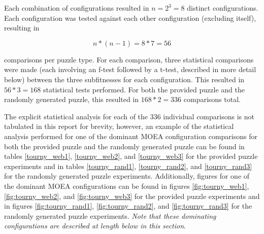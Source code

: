 \documentclass[11pt]{article}
\begin{document}
Each combination of configurations resulted in \begin{math} n = 2^3 = 8 \end{math} distinct configurations. Each configuration
was tested against each other configuration (excluding itself), resulting in  

\[ n * (n - 1) = 8 * 7 = 56 \]

comparisons per puzzle type. For each comparison, three statistical comparisons were made (each 
involving an f-test followed by a t-test, described in more detail below) between the three 
subfitnesses for each configuration. This resulted in \begin{math} 56 * 3 = 168 \end{math}
statistical tests performed. For both the provided puzzle and the randomly generated puzzle, 
this resulted in \begin{math} 168 * 2 = 336 \end{math} comparisons total.

The explicit statistical analysis for each of the 336 individual comparisons is not tabulated in 
this 
report for brevity, however, an example of the statistical analysis performed for one of the 
dominant MOEA configuration comparisons for both the provided puzzle and the randomly generated 
puzzle can be found in tables \ref{tourny_web1}, \ref{tourny_web2}, and \ref{tourny_web3} for the provided puzzle experiments and in tables 
\ref{tourny_rand1}, \ref{tourny_rand2}, and \ref{tourny_rand3} for the randomly generated puzzle experiments.  Additionally, figures for one of the dominant MOEA configurations can be found in figures \ref{fig:tourny_web1},
\ref{fig:tourny_web2}, and \ref{fig:tourny_web3} for the provided puzzle experiments and in figures \ref{fig:tourny_rand1}, \ref{fig:tourny_rand2}, and \ref{fig:tourny_rand3} 
for the randomly generated puzzle experiments. \textit{Note that these dominating configurations are described at length below in this section}.
\end{document}
